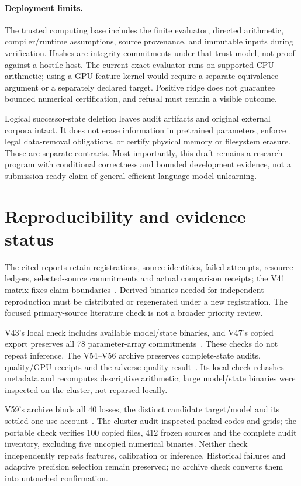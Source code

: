 \documentclass[10pt,twocolumn,letterpaper]{article}
\begin{document}
\paragraph{Deployment limits.}
The trusted computing base includes the finite evaluator, directed arithmetic,
compiler/runtime assumptions, source provenance, and immutable inputs during
verification. Hashes are integrity commitments under that trust model, not proof
against a hostile host. The current exact evaluator runs on supported CPU
arithmetic; using a GPU feature kernel would require a separate equivalence
argument or a separately declared target. Positive ridge does not guarantee
bounded numerical certification, and refusal must remain a visible outcome.

Logical successor-state deletion leaves audit artifacts and original external
corpora intact. It does not erase information in pretrained parameters, enforce
legal data-removal obligations, or certify physical memory or filesystem erasure.
Those are separate contracts. Most importantly, this draft remains a research
program with conditional correctness and bounded development evidence, not a
submission-ready claim of general efficient language-model unlearning.

\section{Reproducibility and evidence status}
The cited reports retain registrations, source identities, failed attempts,
resource ledgers, selected-source commitments and actual comparison receipts;
the V41 matrix fixes claim boundaries~\cite{v39,v40,boundaries}. Derived binaries
needed for independent reproduction must be distributed or regenerated under a
new registration. The focused primary-source literature check is not a broader
priority review.

V43's local check includes available model/state binaries, and V47's copied
export preserves all 78 parameter-array commitments~\cite{v43,v47}. These checks
do not repeat inference. The V54--V56 archive preserves complete-state audits,
quality/GPU receipts and the adverse quality result~\cite{v58terminal}.
Its local check rehashes metadata and recomputes descriptive arithmetic;
large model/state binaries were inspected on the cluster, not reparsed locally.

V59's archive binds all 40 losses, the distinct candidate target/model and its
settled one-use account~\cite{v59terminal}. The cluster audit inspected packed
codes and grids; the portable check verifies 100 copied files, 412 frozen sources
and the complete audit inventory, excluding five uncopied numerical binaries.
Neither check independently repeats features, calibration or inference.
Historical failures and adaptive precision selection remain preserved; no archive
check converts them into untouched confirmation.
\end{document}
